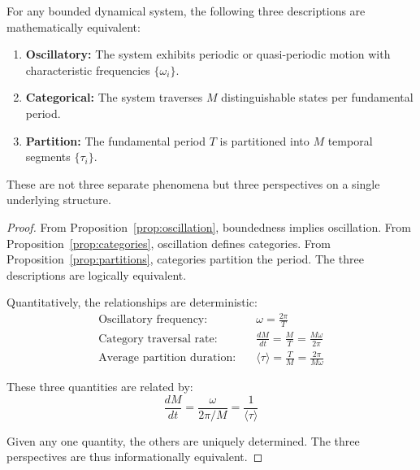 \begin{theorem}
\label{thm:triple}
For any bounded dynamical system, the following three descriptions are mathematically equivalent:
\begin{enumerate}
\item \textbf{Oscillatory:} The system exhibits periodic or quasi-periodic motion with characteristic frequencies $\{\omega_i\}$.
\item \textbf{Categorical:} The system traverses $M$ distinguishable states per fundamental period.
\item \textbf{Partition:} The fundamental period $T$ is partitioned into $M$ temporal segments $\{\tau_i\}$.
\end{enumerate}
These are not three separate phenomena but three perspectives on a single underlying structure.
\end{theorem}

\begin{proof}
From Proposition~\ref{prop:oscillation}, boundedness implies oscillation. From Proposition~\ref{prop:categories}, oscillation defines categories. From Proposition~\ref{prop:partitions}, categories partition the period. The three descriptions are logically equivalent.

Quantitatively, the relationships are deterministic:
\begin{align}
\text{Oscillatory frequency:} \quad & \omega = \frac{2\pi}{T} \\
\text{Category traversal rate:} \quad & \frac{dM}{dt} = \frac{M}{T} = \frac{M\omega}{2\pi} \\
\text{Average partition duration:} \quad & \langle \tau \rangle = \frac{T}{M} = \frac{2\pi}{M\omega}
\end{align}

These three quantities are related by:
\begin{equation}
\boxed{\frac{dM}{dt} = \frac{\omega}{2\pi/M} = \frac{1}{\langle \tau \rangle}}
\label{eq:triple_identity}
\end{equation}

Given any one quantity, the others are uniquely determined. The three perspectives are thus informationally equivalent.
\end{proof}


